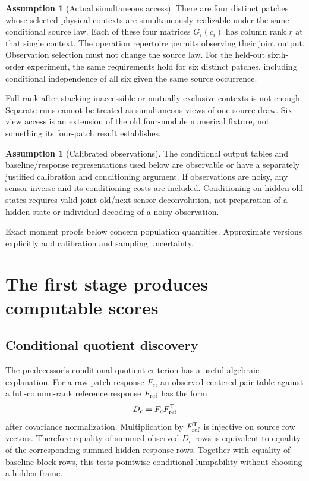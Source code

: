 \documentclass[11pt]{article}
\theoremstyle{definition}
\newtheorem{assumption}[theorem]{Assumption}
\theoremstyle{remark}
\newcommand{\trans}{\mathsf T}
\begin{document}
\begin{assumption}[Actual simultaneous access]
\label{ass:access}
There are four distinct patches whose selected physical contexts are
simultaneously realizable under the same conditional source law. Each of
these four matrices $G_i(c_i)$ has column rank $r$ at that single context.
The operation repertoire permits observing their joint output. Observation
selection must not change the source law. For the held-out sixth-order
experiment, the same requirements hold for six distinct patches, including
conditional independence of all six given the same source occurrence.
\end{assumption}
Full rank after stacking inaccessible or mutually exclusive contexts is not
enough. Separate runs cannot be treated as simultaneous views of one
source draw. Six-view access is an extension of the old four-module
numerical fixture, not something its four-patch result establishes.

\begin{assumption}[Calibrated observations]
\label{ass:calibration}
The conditional output tables and baseline/response representations used
below are observable or have a separately justified calibration and
conditioning argument. If observations are noisy, any sensor inverse and
its conditioning costs are included. Conditioning on hidden old states
requires valid joint old/next-sensor deconvolution, not preparation of a
hidden state or individual decoding of a noisy observation.
\end{assumption}
Exact moment proofs below concern population quantities. Approximate
versions explicitly add calibration and sampling uncertainty.

\section{The first stage produces computable scores}
\label{sec:scores}

\subsection{Conditional quotient discovery}

The predecessor's conditional quotient criterion has a useful algebraic
explanation. For a raw patch response $F_c$, an observed centered pair
table against a full-column-rank reference response $F_{\rm ref}$ has the
form
\begin{equation}
D_c=F_cF_{\rm ref}^\trans
\label{eq:raw-pair}
\end{equation}
after covariance normalization. Multiplication by $F_{\rm ref}^\trans$ is
injective on source row vectors. Therefore equality of summed observed
$D_c$ rows is equivalent to equality of the corresponding summed hidden
response rows. Together with equality of baseline block rows, this tests
pointwise conditional lumpability without choosing a hidden frame.
\end{document}
